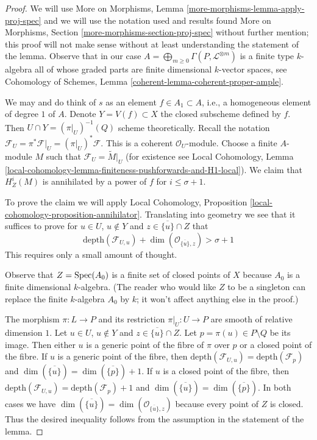 \begin{proof}
We will use More on Morphisms, Lemma \ref{more-morphisms-lemma-apply-proj-spec}
and we will use the notation used and results found
More on Morphisms, Section \ref{more-morphisms-section-proj-spec}
without further mention; this proof will not make sense without
at least understanding the statement of the lemma.
Observe that in our case
$A = \bigoplus_{m \geq 0} \Gamma(P, \mathcal{L}^{\otimes m})$
is a finite type $k$-algebra
all of whose graded parts are finite dimensional $k$-vector spaces, see
Cohomology of Schemes, Lemma \ref{coherent-lemma-coherent-proper-ample}.

\medskip\noindent
We may and do think of $s$ as an element $f \in A_1 \subset A$, i.e.,
a homogeneous element of degree $1$ of $A$. Denote
$Y = V(f) \subset X$ the closed subscheme defined by $f$.
Then $U \cap Y = (\pi|_U)^{-1}(Q)$ scheme theoretically.
Recall the notation
$\mathcal{F}_U = \pi^*\mathcal{F}|_U = (\pi|_U)^*\mathcal{F}$.
This is a coherent $\mathcal{O}_U$-module.
Choose a finite $A$-module $M$ such that
$\mathcal{F}_U = \widetilde{M}|_U$
(for existence see Local Cohomology, Lemma
\ref{local-cohomology-lemma-finiteness-pushforwards-and-H1-local}).
We claim that $H^i_Z(M)$ is annihilated by
a power of $f$ for $i \leq \sigma + 1$.

\medskip\noindent
To prove the claim we will apply
Local Cohomology, Proposition \ref{local-cohomology-proposition-annihilator}.
Translating into geometry we see that it suffices to prove
for $u \in U$, $u \not \in Y$ and $z \in \overline{\{u\}} \cap Z$
that
$$
\text{depth}(\mathcal{F}_{U, u}) +
\dim(\mathcal{O}_{\overline{\{u\}}, z}) > \sigma + 1
$$
This requires only a small amount of thought.

\medskip\noindent
Observe that $Z = \mathop{\mathrm{Spec}}(A_0)$ is a finite set of closed points of $X$ because
$A_0$ is a finite dimensional $k$-algebra.
(The reader who would like $Z$ to be a singleton can replace the
finite $k$-algebra $A_0$ by $k$; it won't affect anything else in the proof.)

\medskip\noindent
The morphism $\pi : L \to P$ and its restriction $\pi|_U : U \to P$
are smooth of relative dimension $1$.
Let $u \in U$, $u \not \in Y$ and $z \in \overline{\{u\}} \cap Z$.
Let $p = \pi(u) \in P \setminus Q$ be its image.
Then either $u$ is a generic
point of the fibre of $\pi$ over $p$ or a closed point of the fibre.
If $u$ is a generic point of the fibre, then
$\text{depth}(\mathcal{F}_{U, u}) = \text{depth}(\mathcal{F}_p)$
and
$\dim(\overline{\{u\}}) = \dim(\overline{\{p\}}) + 1$.
If $u$ is a closed point of the fibre, then
$\text{depth}(\mathcal{F}_{U, u}) = \text{depth}(\mathcal{F}_p) + 1$
and
$\dim(\overline{\{u\}}) = \dim(\overline{\{p\}})$.
In both cases we have
$\dim(\overline{\{u\}}) = \dim(\mathcal{O}_{\overline{\{u\}}, z})$
because every point of $Z$ is closed. Thus the desired
inequality follows from the assumption in the statement of
the lemma.


\end{proof}
